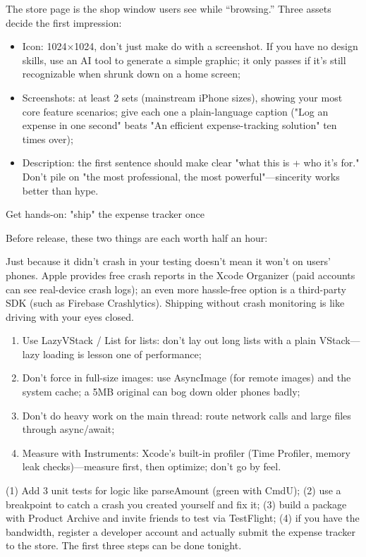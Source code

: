 
The store page is the shop window users see while “browsing.” Three assets decide the first impression:

\begin{itemize}
  \item Icon: 1024×1024, don't just make do with a screenshot. If you have no design skills, use an AI tool to generate a simple graphic; it only passes if it's still recognizable when shrunk down on a home screen;
  \item Screenshots: at least 2 sets (mainstream iPhone sizes), showing your most core feature scenarios; give each one a plain-language caption ("Log an expense in one second" beats "An efficient expense-tracking solution" ten times over);
  \item Description: the first sentence should make clear "what this is + who it's for." Don't pile on "the most professional, the most powerful"—sincerity works better than hype.
\end{itemize}

\begin{tcbpractice}{Get hands-on: "ship" the expense tracker once}

Before release, these two things are each worth half an hour:


Just because it didn't crash in your testing doesn't mean it won't on users' phones. Apple provides free crash reports in the Xcode Organizer (paid accounts can see real-device crash logs); an even more hassle-free option is a third-party SDK (such as Firebase Crashlytics). Shipping without crash monitoring is like driving with your eyes closed.


\begin{enumerate}
  \item Use LazyVStack / List for lists: don't lay out long lists with a plain VStack—lazy loading is lesson one of performance;
  \item Don't force in full-size images: use AsyncImage (for remote images) and the system cache; a 5MB original can bog down older phones badly;
  \item Don't do heavy work on the main thread: route network calls and large files through async/await;
  \item Measure with Instruments: Xcode's built-in profiler (Time Profiler, memory leak checks)—measure first, then optimize; don't go by feel.
\end{enumerate}

(1) Add 3 unit tests for logic like parseAmount (green with CmdU); (2) use a breakpoint to catch a crash you created yourself and fix it; (3) build a package with Product Archive and invite friends to test via TestFlight; (4) if you have the bandwidth, register a developer account and actually submit the expense tracker to the store. The first three steps can be done tonight.

\end{tcbpractice}

